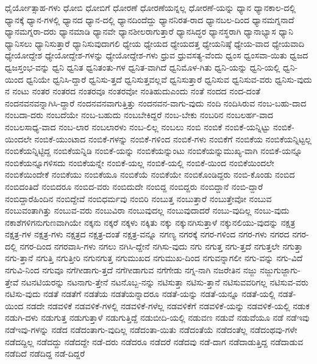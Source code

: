 {ಧೈರ್ಯೋತ್ಸಾಹ-ಗಳು
ಧೋಬಿ
ಧೋಬಿಗೆ
ಧೋರಣೆ
ಧೋರಣೆಯನ್ನಲ್ಲ
ಧೋರಣೆ-ಯನ್ನು
ಧ್ಯಾನ
ಧ್ಯಾನಕಾಲ-ದಲ್ಲಿ
ಧ್ಯಾನಕ್ಕೆ
ಧ್ಯಾನ-ಗಳಲ್ಲಿ
ಧ್ಯಾನದ
ಧ್ಯಾನ-ದಲ್ಲಿ
ಧ್ಯಾನದಿಂದೆದ್ದು
ಧ್ಯಾನನಿರತ-ರಾದ
ಧ್ಯಾನಬಲ-ದಿಂದ
ಧ್ಯಾನಮಗ್ನನಾದೆ
ಧ್ಯಾನಮಗ್ನರಾ-ದರು
ಧ್ಯಾನಮಾಡಿ
ಧ್ಯಾನವೇ
ಧ್ಯಾನಶೀಲರಾಗುತ್ತಾರೆ
ಧ್ಯಾನಸಿದ್ಧರ
ಧ್ಯಾನಸ್ಥರಾಗಿ
ಧ್ಯಾನಾಭ್ಯಾಸ
ಧ್ಯಾನಿ
ಧ್ಯಾನಿಸಲು
ಧ್ಯಾನಿಸುತ್ತಾರೆ
ಧ್ಯಾನಿಸುವುದಾಗಲಿ
ಧ್ಯೇಯ
ಧ್ಯೇಯದ
ಧ್ಯೇಯದತ್ತ
ಧ್ಯೇಯನಿಷ್ಠೆ
ಧ್ಯೇಯ-ವಾದ
ಧ್ಯೇಯವಾದಿ
ಧ್ಯೇಯೋದ್ದೇಶ
ಧ್ಯೇಯೋದ್ದೇಶ-ಗಳನ್ನು
ಧ್ಯೇಯೋದ್ದೇಶ-ಗಳು
ಧ್ರುವ
ಧ್ರುವಸತ್ಯ-ವೆಂದು
ಧ್ವಂಸ
ಧ್ವಂಸವಾ-ಯಿತು
ಧ್ವಜದ
ಧ್ವಜಸ್ತಂಭ-ವನ್ನು
ಧ್ವನಿ
ಧ್ವನಿತ
ಧ್ವನಿತಂತು-ಗಳ
ಧ್ವನಿತ-ವಾಗಿದೆ
ಧ್ವನಿಮೊಳ-ಗಿತು
ಧ್ವನಿ-ಯನ್ನು
ಧ್ವನಿ-ಯಲ್ಲಿ
ಧ್ವನಿ-ಯಿಂದ
ಧ್ವನಿಯೇ
ಧ್ವನಿಸಿ-ದ್ದಾರೆ
ಧ್ವನಿಸು-ತ್ತದೆ
ಧ್ವನಿಸುತ್ತವಲ್ಲವೆ
ಧ್ವನಿಸುತ್ತಾರೆ
ಧ್ವನಿಸುವ
ಧ್ವನಿಸುವ-ವರು
ಧ್ವನಿಸು-ವುದು
ನ
ನಂಟು
ನಂತರ
ನಂತರದ
ನಂತರವೂ
ನಂತರವೋ
ನಂತಿಹುದುಎಂದು
ನಂತೆ
ನಂದದ
ನಂದ-ದಂತೆ
ನಂದನವನವನ್ನಾಗಿಸಿ-ದ್ದಾರೆ
ನಂದನವನವಾಗುತ್ತಿತ್ತು
ನಂದನವನ-ವಾಗು-ವುದು
ನಂದಿ
ನಂದಿಸಿರುವ
ನಂಬ-ಬಹು-ದಾದ
ನಂಬದಾ-ದರು
ನಂಬದೆಯೇ
ನಂಬ-ಬಹುದು
ನಂಬಬೇಕಿದ್ದರೆ
ನಂಬ-ಬೇಕು
ನಂಬರಿನ
ನಂಬಲರ್ಹ-ವಾದ
ನಂಬಲಸಾಧ್ಯ-ವಾದ
ನಂಬ-ಲಾರ
ನಂಬಲಾರಳು
ನಂಬ-ಲಿಲ್ಲ
ನಂಬಲು
ನಂಬಿ
ನಂಬಿಕೆ
ನಂಬಿಕೆ-ಯನ್ನಿಟ್ಟು
ನಂಬಿಕೆ-ಯಿಂದಲೇ
ನಂಬಿಕೆ-ಯುಂಟಾದ
ನಂಬಿಕೆ-ಗಳನ್ನು
ನಂಬಿಕೆ-ಗಳಿಂದ
ನಂಬಿಕೆ-ಗಳು
ನಂಬಿಕೆಗೆ
ನಂಬಿಕೆಯ
ನಂಬಿಕೆಯನ್ನಿಟ್ಟಲ್ಲ
ನಂಬಿಕೆಯನ್ನಿಟ್ಟಿದ್ದ
ನಂಬಿಕೆಯನ್ನಿಡಿ
ನಂಬಿಕೆ-ಯನ್ನು
ನಂಬಿಕೆಯನ್ನುಂಟು
ನಂಬಿಕೆಯನ್ನುಮುಖ್ಯ-ವಾಗಿ
ನಂಬಿಕೆ-ಯನ್ನೂ
ನಂಬಿಕೆಯನ್ನೂಗಳಿಸದು
ನಂಬಿಕೆಯನ್ನೇ
ನಂಬಿಕೆ-ಯಲ್ಲ
ನಂಬಿಕೆ-ಯಲ್ಲಿ
ನಂಬಿಕೆ-ಯಿಂದ
ನಂಬಿಕೆಯಿಂದಲೇ
ನಂಬಿಕೆಯಿಂದೇಕೆ
ನಂಬಿಕೆಯು
ನಂಬಿಕೆಯೂ
ನಂಬಿಕೆಯೆ
ನಂಬಿಕೆಯೇ
ನಂಬಿಕೊಂಡಿದ್ದರು
ನಂಬಿ-ಕೊಂಡು
ನಂಬಿದ
ನಂಬಿದಂತಿದೆ
ನಂಬಿದರೂ
ನಂಬಿದ-ವರು
ನಂಬಿದುದೇ
ನಂಬಿದ್ದ
ನಂಬಿದ್ದರು
ನಂಬಿದ್ದಾನೆ
ನಂಬಿ-ದ್ದಾರೆ
ನಂಬಿದ್ದಾರೆಹಿಂದಿನ
ನಂಬಿದ್ದೇವೆ
ನಂಬಿಧರ್ಮವು
ನಂಬಿರಿ
ನಂಬುತ್ತ
ನಂಬುತ್ತಾರೆ
ನಂಬುತ್ತೇವೋ
ನಂಬುವ
ನಂಬುವಂತಾಗಿತ್ತು
ನಂಬುವ-ವರು
ನಂಬುವಿರಾ
ನಂಬುವುದಲ್ಲ
ನಂಬುವುದಾದರೆ
ನಂಬು-ವುದಿಲ್ಲ
ನಂಬು-ವುದು
ನಕಾಶೆಗಳಿಗನುಗುಣವಾಗಿಯೇ
ನಕ್ಕನು
ನಕ್ಕರೆ
ನಕ್ಕಳು
ನಕ್ಕಿತು
ನಕ್ಕು
ನಕ್ಕುನಗಿಸುತ್ತಾಳೆ
ನಕ್ಕುನಲಿಯು-ವುದನ್ನು
ನಕ್ಷತ್ರ
ನಕ್ಷತ್ರ-ಗಳ
ನಕ್ಷತ್ರ-ಗಳು
ನಕ್ಷತ್ರದ
ನಕ್ಷತ್ರ-ದಂತೆ
ನಕ್ಷತ್ರ-ವನ್ನೂ
ನಗಣ್ಯ
ನಗರಕ್ಕೆ
ನಗರ-ಗಳಿಂದ
ನಗರ-ಗಳು
ನಗರದ
ನಗರ-ದಲ್ಲಿ
ನಗರ-ದಿಂದ
ನಗರವಾಸಿ-ಗಳು
ನಗಲು
ನಗಿಸಿ-ದ್ದೇನೆ
ನಗಿಸು-ವುದು
ನಗು
ನಗುತ್ತ
ನಗು-ತ್ತದೆ
ನಗುತ್ತಲೇ
ನಗುತ್ತಾ
ನಗು-ತ್ತಾನೆ
ನಗುತ್ತಿ
ನಗುತ್ತೀರಿ
ನಗುನಗುತ್ತ
ನಗುಮುಖದ
ನಗುಮುಖ-ದಿಂದ
ನಗುವನ್ನಾಗಲೀ
ನಗು-ವನ್ನು
ನಗು-ವಿದೆ
ನಗುವಿ-ನಿಂದ
ನಗುವೂ
ನಗೆಗೀಡಾಗು-ತ್ತದೆ
ನಗೆಗೀಡಾಗುವ
ನಗೆಗೇಡು
ನಗ್ನ-ನಾಗಿ
ನಜರೇತಿನ
ನಜ್ಜು
ನಜ್ಜುಗುಜ್ಜಾಗು-ತ್ತೇವೆ
ನಟನಟಿಯರನ್ನು
ನಟನಾಗು-ತ್ತೇನೆ
ನಟನೊಬ್ಬ-ನನ್ನು
ನಟಿಸುತ್ತಾ
ನಟಿಸು-ತ್ತಾನೆ
ನಟಿಸುವವರಿಗಲ್ಲ
ನಟಿಸುವ-ವರು
ನಟಿಸು-ವುದು
ನಡತೆ
ನಡತೆಗೆ
ನಡತೆಯ
ನಡತೆಯನ್ನಾದರೂ
ನಡತೆ-ಯನ್ನು
ನಡತೆ-ಯನ್ನೂ
ನಡತೆ-ಯಲ್ಲಿ
ನಡತೆ-ಯಿಂದ
ನಡದೇ
ನಡವಳಿಕೆ
ನಡವಳಿಕೆ-ಗಳಲ್ಲಿ
ನಡವಳಿಕೆ-ಗಳೆಲ್ಲ
ನಡವಳಿಕೆಗೆ
ನಡವಳಿಕೆ-ಯನ್ನು
ನಡವಳಿಕೆ-ಯಲ್ಲಿ
ನಡುಕ
ನಡುಗಿ-ದಳು
ನಡುಗುತ್ತ
ನಡುಗುತ್ತಾಳೆ
ನಡುಗುತ್ತಿದ್ದೆ
ನಡುಬೀದಿ-ಯಲ್ಲಿ
ನಡುವಣ
ನಡುವೆ
ನಡುವೆಯೂ
ನಡೆ
ನಡೆಇವು
ನಡೆಇವು-ಗಳನ್ನು
ನಡೆದ
ನಡೆದಂತಾಗು-ವುದಿಲ್ಲ
ನಡೆದಂತಾ-ಯಿತು
ನಡೆದಂತೆಯೆ
ನಡೆದಂತೆಲ್ಲ
ನಡೆದಂಥವು-ಗಳೇ
ನಡೆದದ್ದಿಲ್ಲ
ನಡೆದದ್ದು
ನಡೆದದ್ದೇ
ನಡೆ-ದರು
ನಡೆದರೂ
ನಡೆದರೆ
ನಡೆದವು
ನಡೆ-ದಾಗ
ನಡೆದಾಡುತ್ತಿದ್ದ
ನಡೆದಾಡುವ
ನಡೆದಿದೆ
ನಡೆದಿದ್ದ
ನಡೆ-ದಿದ್ದರೆ
}
